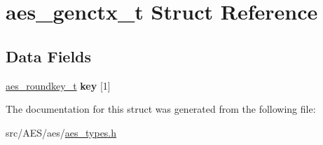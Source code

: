 \hypertarget{structaes__genctx__t}{\section{aes\-\_\-genctx\-\_\-t Struct Reference}
\label{structaes__genctx__t}
}
\subsection*{Data Fields}
\begin{DoxyCompactItemize}
\item 
\hypertarget{structaes__genctx__t_ad14597dc3319c5b64b7a5766962d1f5b}{\hyperlink{structaes__roundkey__t}{aes\-\_\-roundkey\-\_\-t} {\bfseries key} \mbox{[}1\mbox{]}}\label{structaes__genctx__t_ad14597dc3319c5b64b7a5766962d1f5b}

\end{DoxyCompactItemize}


The documentation for this struct was generated from the following file\-:\begin{DoxyCompactItemize}
\item 
src/\-A\-E\-S/aes/\hyperlink{aes__types_8h}{aes\-\_\-types.\-h}\end{DoxyCompactItemize}

